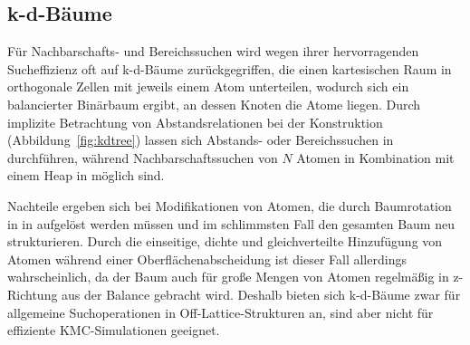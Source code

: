 
\subsection{k-d-Bäume}
\label{datakdtree}

Für Nachbarschafts- und Bereichssuchen wird wegen ihrer hervorragenden Sucheffizienz oft auf k-d-Bäume zurückgegriffen, die einen kartesischen Raum in orthogonale Zellen mit jeweils einem Atom unterteilen, wodurch sich ein balancierter Binärbaum ergibt, an dessen Knoten die Atome liegen.
Durch implizite Betrachtung von Abstandsrelationen bei der Konstruktion (Abbildung~\ref{fig:kdtree}) lassen sich Abstands- oder Bereichssuchen in  durchführen, während Nachbarschaftssuchen von $N$ Atomen in Kombination mit einem Heap in  möglich sind.

Nachteile ergeben sich bei Modifikationen von Atomen, die durch Baumrotation in in  aufgelöst werden müssen und im schlimmsten Fall den gesamten Baum neu strukturieren.
Durch die einseitige, dichte und gleichverteilte Hinzufügung von Atomen während einer Oberflächenabscheidung ist dieser Fall allerdings wahrscheinlich, da der Baum auch für große Mengen von Atomen regelmäßig in z-Richtung aus der Balance gebracht wird.
Deshalb bieten sich k-d-Bäume zwar für allgemeine Suchoperationen in Off-Lattice-Strukturen an, sind aber nicht für effiziente KMC-Simulationen geeignet.

